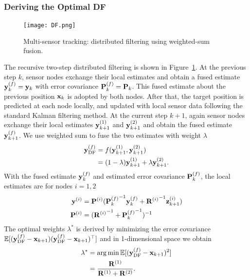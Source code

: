 \subsubsection{Deriving the Optimal DF}
\begin{figure}[htbp]
\centering
\texttt{[image: DF.png]}
\caption{Multi-sensor tracking: distributed filtering using weighted-sum fusion.}
\label{fig:DF}
\end{figure}
The recursive two-step distributed filtering is shown in Figure~\ref{fig:DF}. At the previous step $k$, sensor nodes exchange their local estimates and obtain a fused estimate ${\bf y}^{(f)}_k={\bf y}_k$ with error covariance ${\bf P}^{(f)}_k={\bf P}_k$. This fused estimate about the previous position ${\bf x}_k$ is adopted by both nodes. After that, the target position is predicted at each node locally, and updated with local sensor data  following the standard Kalman filtering method. At the current step $k+1$, again sensor nodes exchange their local estimates ${\bf y}^{(1)}_{k+1}$ and ${\bf y}^{(2)}_{k+1}$ and obtain the fused estimate ${\bf y}^{(f)}_{k+1}$. We use weighted sum to fuse the two estimates with weight $\lambda$
\begin{equation}
\begin{split}
{\bf y}^{(f)}_{\text{DF}}&=f({\bf y}^{(1)}_{k+1},{\bf y}^{(2)}_{k+1})\\
&=(1-\lambda){\bf y}^{(1)}_{k+1}+\lambda{\bf y}^{(2)}_{k+1}.
\end{split}
\end{equation}
With the fused estimate ${\bf y}^{(f)}_k$ and estimated error covariance ${\bf P}_k^{(f)}$, the local estimates are for nodes $i=1,2$
\begin{equation}
\label{eq:localupdate}
\begin{split}
{\bf y}^{(i)}&={\bf P}^{(i)}({{\bf P}_k^{(f)}}^{-1}{\bf y}_k^{(f)}+{{\bf R}^{(i)}}^{-1}{\bf z}^{(i)}_{k+1}) \\%
{\bf P}^{(i)}&=({{\bf R}^{(i)}}^{-1}+{{\bf P}_k^{(f)}}^{-1})^{-1}%
\end{split}
\end{equation}
The optimal weights $\lambda^*$ is derived by minimizing the error covariance $\mathbb{E}[({{\bf y}^{(f)}_{\text{DF}}}-{\bf x}_{k+1})({{\bf y}^{(f)}_{\text{DF}}}-{\bf x}_{k+1})^\top]$ and in 1-dimensional space we obtain
\begin{equation}
\begin{split}
\lambda^*&=\arg\min\mathbb{E}[({{\bf y}^{(f)}_{\text{DF}}}-{\bf x}_{k+1})^2]\\
&=\frac{{\bf R}^{(1)}}{{\bf R}^{(1)}+{\bf R}^{(2)}}. \\
\end{split}
\end{equation}
